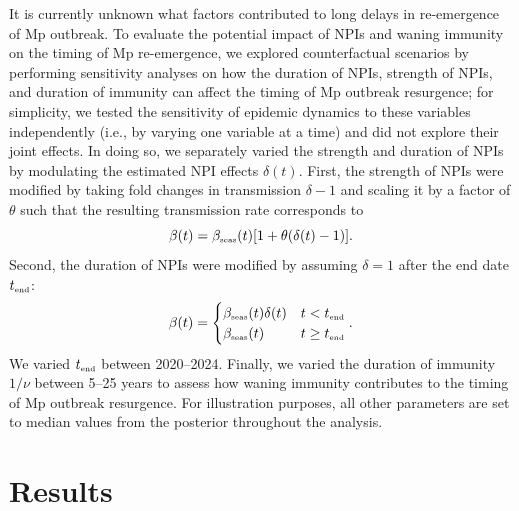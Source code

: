 \documentclass[12pt]{article}
\newcommand{\tsub}[2]{#1_{{\textrm{\tiny #2}}}}
\begin{document}
It is currently unknown what factors contributed to long delays in re-emergence of Mp outbreak.
To evaluate the potential impact of NPIs and waning immunity on the timing of Mp re-emergence, we explored counterfactual scenarios by performing sensitivity analyses on how the duration of NPIs, strength of NPIs, and duration of immunity can affect the timing of Mp outbreak resurgence; 
for simplicity, we tested the sensitivity of epidemic dynamics to these variables independently (i.e., by varying one variable at a time) and did not explore their joint effects.
In doing so, we separately varied the strength and duration of NPIs by modulating the estimated NPI effects $\delta(t)$.
First, the strength of NPIs were modified by taking fold changes in transmission $\delta-1$ and scaling it by a factor of $\theta$ such that the resulting transmission rate corresponds to
\begin{equation}
\beta(t) = \tsub{\beta}{seas}(t) [1+\theta (\delta(t)-1)].
\end{equation}
Second, the duration of NPIs were modified by assuming $\delta = 1$ after the end date $\tsub{t}{end}$:
\begin{equation}
\beta(t) = \begin{cases}
\tsub{\beta}{seas}(t) \delta(t) & t <  \tsub{t}{end}\\
\tsub{\beta}{seas}(t) & t \geq \tsub{t}{end}
\end{cases}.
\end{equation}
We varied $\tsub{t}{end}$ between 2020--2024.
Finally, we varied the duration of immunity $1/\nu$ between 5--25 years to assess how waning immunity contributes to the timing of Mp outbreak resurgence.
For illustration purposes, all other parameters are set to median values from the posterior throughout the analysis.

\section{Results}
\end{document}
